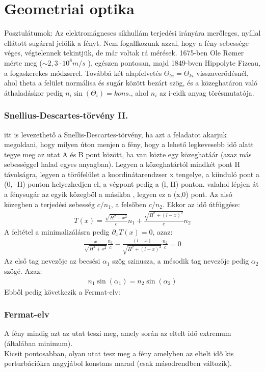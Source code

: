 \documentclass{article}
\begin{document}
\section{Geometriai optika}
Posztulátumok: Az elektromágneses síkhullám terjedési irányára merőleges, nyíllal ellátott sugárral jelölik a fényt. Nem fogallkozunk azzal, hogy a fény sebessége véges, végtelennek tekintjük, de már voltak rá mérések. 1675-ben Ole Rømer mérte meg ($\sim 2,3 \cdot 10^{8} m/s$ ), egészen pontosan, majd 1849-bven Hippolyte Fizeau, a fogaskerekes módzsrrel. Továbbá két alapfelvetés $\Theta_{be} = \Theta_{ki}$ visszaverődésnél, ahol theta a felület normálisa és sugár között bezárt szög, és a közeghatáron való áthaladáskor pedig $n_i \sin(\Theta_i) = kons.$, ahol $n_i$ az i-eidk anyag törésmutatója.
\subsubsection{Snellius-Descartes-törvény II.}
itt is levezethető a Snellis-Descartes-törvény, ha azt a feladatot akarjuk megoldani, hogy milyen úton menjen a fény, hogy a lehető legkevesebb idő alatt tegye meg az utat A és B pont között, ha van közte egy közeghatáár (azaz más sebességgel halad egyes anyagban). Legyen a közeghatártól mindkét pont H távolságra, legyen a törőfelület a koordinátarendzser x tengelye, a kiinduló pont a (0, -H) ponton helyezhedjen el, a végpont pedig a (l, H) ponton. valahol lépjen át a fénysugár az egyik közegből a másikba , legyen ez a (x,0) pont. Az alsó közegben a terjedési sebesség $c/n_1$, a felsőben $c/n_2$. Ekkor az idő útfüggése:
\begin{gather*}
T(x)=\frac{\sqrt{H^2 + x^2}}{c} n_1 + \frac{\sqrt{H^2+(l-x)^2}}{c}n_2 
\end{gather*}
A feltétel a minimalizálásra pedig $\partial_x T(x) = 0$, azaz:
\begin{gather*}
\frac{x}{\sqrt{H^2+x^2}} \frac{n_1}{c} - \frac{(l-x)}{\sqrt{H^2+ (l-x)^2}}\frac{n_2}{c} = 0
\end{gather*}
Az első tag nevezője az beesési $\alpha_1$ szög szinusza, a mésodik tag nevezője pedig $\alpha_2$ szögé. Azaz:
\begin{gather*}
n_1 \sin(\alpha_1) = n_2 \sin(\alpha_2)
\end{gather*}
Ebből pedig következik a Fermat-elv:
\subsubsection{Fermat-elv}
A fény mindig azt az utat teszi meg, amely során az eltelt idő extremum (általában minimum). \\
Kicsit pontosabban, olyan utat tesz meg a fény amelyben az eltelt idő kis perturbációkra nagyjábol konstans marad (csak másodrendben változik).
\end{document}
